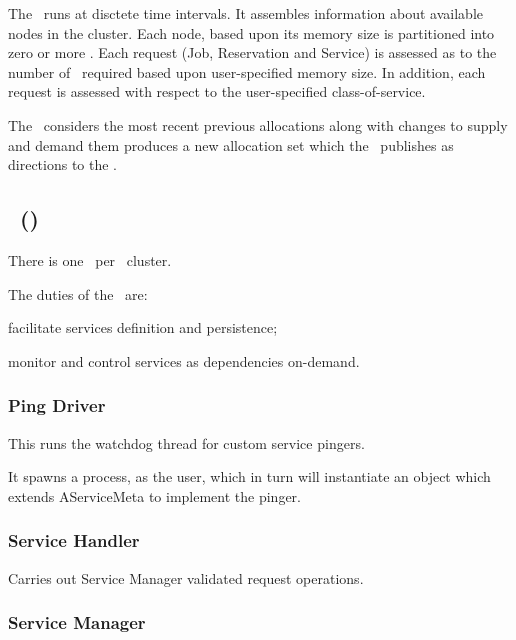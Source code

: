 \begin{itemize}
    The \varScheduler~runs at disctete time intervals.
    It assembles information about available nodes in the cluster.
    Each node, based upon its memory size is partitioned into zero or more \varShares.
    Each request (Job, Reservation and Service) is assessed as to the number of
    \varShares~required based upon user-specified memory size. 
    In addition, each request is assessed with respect to the user-specified class-of-service.

    The \varScheduler~considers the most recent previous allocations along with changes
    to supply and demand them produces a new allocation set which the 
    \varResourceManager~publishes as directions to the \varOrchestrator.
    
    \subsection{\varServicesManager~(\varSM)}    
    
    There is one \varServicesManager~per \varDUCC~cluster.
    
    The duties of the \varServicesManager~are:
    
    \begin{description}
      \item facilitate services definition and persistence;
      \item monitor and control services as dependencies on-demand.
    \end{description}
        
    \subsubsection{Ping Driver} 
    
    This runs the watchdog thread for custom service pingers.
 
    It spawns a process, as the user, which in turn will instantiate an object which extends
    AServiceMeta to implement the pinger.

    \subsubsection{Service Handler} 
    
    Carries out Service Manager validated request operations.
            
    \subsubsection{Service Manager} 
    

\end{itemize}
